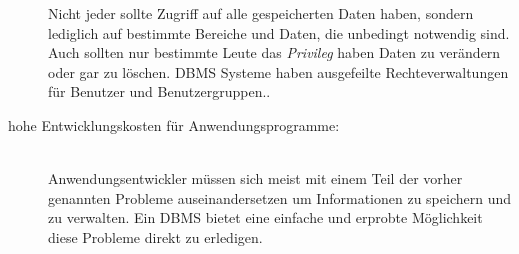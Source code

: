 \begin{description}
  	Nicht jeder sollte Zugriff auf alle gespeicherten Daten haben, sondern lediglich auf bestimmte Bereiche und Daten, die unbedingt notwendig sind. Auch sollten nur bestimmte Leute das \textit{Privileg} haben Daten zu verändern oder gar zu löschen. DBMS Systeme haben ausgefeilte Rechteverwaltungen für Benutzer und Benutzergruppen.. 
  \item[hohe Entwicklungskosten für Anwendungsprogramme:] \hfill \\
  	Anwendungsentwickler müssen sich meist mit einem Teil der vorher genannten Probleme auseinandersetzen um Informationen zu speichern und zu verwalten. Ein DBMS bietet eine einfache und erprobte Möglichkeit diese Probleme direkt zu erledigen.
\end{description}